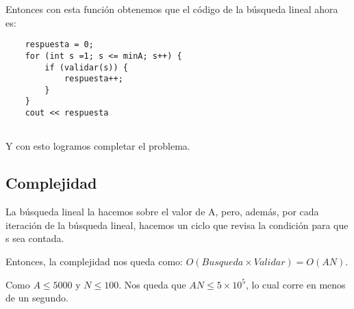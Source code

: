 Entonces con esta función obtenemos que el código de la búsqueda lineal ahora es:
\begin{lstlisting}
	respuesta = 0;
	for (int s =1; s <= minA; s++) {
		if (validar(s)) {
			respuesta++;
		}
	}
	cout << respuesta
	
\end{lstlisting}

Y con esto logramos completar el problema.

\subsection{Complejidad}
La búsqueda lineal la hacemos sobre el valor de A, pero, además, por cada iteración de la búsqueda lineal, hacemos un ciclo que revisa la condición para que s sea contada.

Entonces, la complejidad nos queda como:   \(O(Busqueda\times Validar)=O(AN)\).

Como \(A\leq 5000\) y \(N\leq 100\). Nos queda que \(AN\leq 5\times 10^5\), lo cual corre en menos de un segundo.
